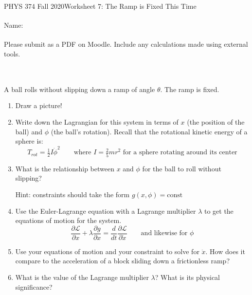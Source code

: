 \documentclass[12pt]{article}
\begin{document}
PHYS 374 Fall 2020\hfill Worksheet 7: The Ramp is Fixed This Time\\
\\
Name:\\
\\
Please submit as a PDF on Moodle. Include any calculations made using external tools.

\hrulefill
\\
\\
A ball rolls without slipping down a ramp of angle $\theta$. The ramp is fixed. 

\begin{enumerate}
\item Draw a picture!
\item Write down the Lagrangian for this system in terms of $x$ (the position of the ball) and $\phi$ (the ball's rotation). Recall that the rotational kinetic energy of a sphere is:
$$
T_{rot} = \tfrac{1}{2} I \dot{\phi}^2
\quad\quad\text{where $I=\tfrac{2}{5}mr^2$ for a sphere rotating around its center}
$$
\item What is the relationship between $x$ and $\phi$ for the ball to roll without slipping?

Hint: constraints should take the form $g(x, \phi) = \text{const}$
\item Use the Euler-Lagrange equation with a Lagrange multiplier $\lambda$ to get the equations of motion for the system.
$$
\frac{\partial \mathcal{L}}{\partial x} + \lambda \frac{\partial g}{\partial x} = \frac{d}{dt} \frac{\partial \mathcal{L}}{\partial \dot{x}}
\quad\quad\text{and likewise for $\phi$}
$$
\item Use your equations of motion and your constraint to solve for $\ddot{x}$. How does it compare to the acceleration of a block sliding down a frictionless ramp? 
\item What is the value of the Lagrange multiplier $\lambda$? What is its physical significance?

\end{enumerate}
\end{document}
